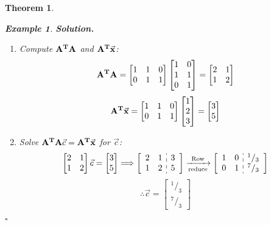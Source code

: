 \documentclass[12pt, a4paper]{article}
\newtheorem{thm}{Theorem}[subsection]
\newtheorem{eg}{Example}[subsection]
\newenvironment*{sol}{\par\indent\textbf{\textit{Solution. }}}{\hfill{$\square$}\par}
\def\T{{\vb{T}}}
\def\vecx{\va{x}}
\def\matrixA{\vb{A}}
\begin{document}
\begin{thm}
\begin{eg}
\begin{sol}
\begin{enumerate}
				\item Compute $\matrixA^\T\matrixA$ and $\matrixA^\T\vecx$: \[\matrixA^\T\matrixA=\begin{bmatrix}1&1&0\\0&1&1\end{bmatrix}\begin{bmatrix}1&0\\1&1\\0&1\end{bmatrix}=\begin{bmatrix}2&1\\1&2\end{bmatrix}\]\[\matrixA^\T\vecx=\begin{bmatrix}1&1&0\\0&1&1\end{bmatrix}\begin{bmatrix}1\\2\\3\end{bmatrix}=\begin{bmatrix}3\\5\end{bmatrix}\]
				\item Solve $\matrixA^\T\matrixA\vec{c}=\matrixA^\T\vecx$ for $\vec{c}$: 
				\[\begin{bmatrix}2&1\\1&2\end{bmatrix}\vec{c}=\begin{bmatrix}3\\5\end{bmatrix}\Longrightarrow\left[\begin{array}{c:c}\begin{matrix}2&1\\1&2\end{matrix}&\begin{matrix}3\\5\end{matrix}\end{array}\right]\xrightarrow[\text{reduce}]{\text{Row}}\left[\begin{array}{c:c}\begin{matrix}1&0\\0&1\end{matrix}&\begin{matrix}^1/_3\\^7/_3\end{matrix}\end{array}\right]\]
				\[\therefore\vec{c}=\begin{bmatrix}^1/_3\\^7/_3\end{bmatrix}\]

\end{enumerate}
\end{sol}
\end{eg}
\end{thm}
\end{document}
